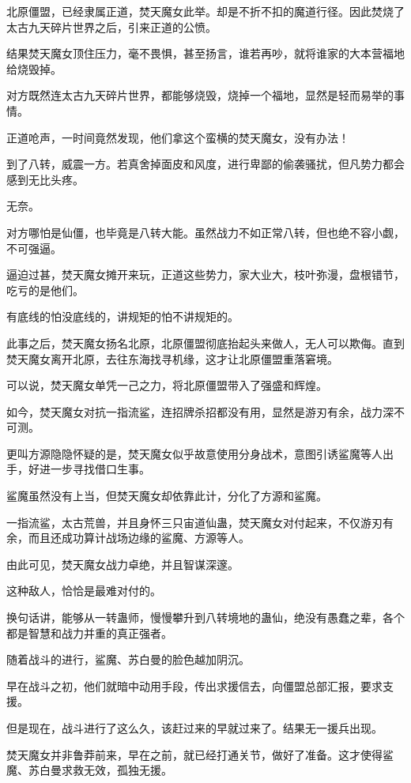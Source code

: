 \begin{this_body}
北原僵盟，已经隶属正道，焚天魔女此举。却是不折不扣的魔道行径。因此焚烧了太古九天碎片世界之后，引来正道的公愤。

结果焚天魔女顶住压力，毫不畏惧，甚至扬言，谁若再吵，就将谁家的大本营福地给烧毁掉。

对方既然连太古九天碎片世界，都能够烧毁，烧掉一个福地，显然是轻而易举的事情。

正道呛声，一时间竟然发现，他们拿这个蛮横的焚天魔女，没有办法！

到了八转，威震一方。若真舍掉面皮和风度，进行卑鄙的偷袭骚扰，但凡势力都会感到无比头疼。

无奈。

对方哪怕是仙僵，也毕竟是八转大能。虽然战力不如正常八转，但也绝不容小觑，不可强逼。

逼迫过甚，焚天魔女摊开来玩，正道这些势力，家大业大，枝叶弥漫，盘根错节，吃亏的是他们。

有底线的怕没底线的，讲规矩的怕不讲规矩的。

此事之后，焚天魔女扬名北原，北原僵盟彻底抬起头来做人，无人可以欺侮。直到焚天魔女离开北原，去往东海找寻机缘，这才让北原僵盟重落窘境。

可以说，焚天魔女单凭一己之力，将北原僵盟带入了强盛和辉煌。

如今，焚天魔女对抗一指流鲨，连招牌杀招都没有用，显然是游刃有余，战力深不可测。

更叫方源隐隐怀疑的是，焚天魔女似乎故意使用分身战术，意图引诱鲨魔等人出手，好进一步寻找借口生事。

鲨魔虽然没有上当，但焚天魔女却依靠此计，分化了方源和鲨魔。

一指流鲨，太古荒兽，并且身怀三只宙道仙蛊，焚天魔女对付起来，不仅游刃有余，而且还成功算计战场边缘的鲨魔、方源等人。

由此可见，焚天魔女战力卓绝，并且智谋深邃。

这种敌人，恰恰是最难对付的。

换句话讲，能够从一转蛊师，慢慢攀升到八转境地的蛊仙，绝没有愚蠢之辈，各个都是智慧和战力并重的真正强者。

随着战斗的进行，鲨魔、苏白曼的脸色越加阴沉。

早在战斗之初，他们就暗中动用手段，传出求援信去，向僵盟总部汇报，要求支援。

但是现在，战斗进行了这么久，该赶过来的早就过来了。结果无一援兵出现。

焚天魔女并非鲁莽前来，早在之前，就已经打通关节，做好了准备。这才使得鲨魔、苏白曼求救无效，孤独无援。


\end{this_body}
